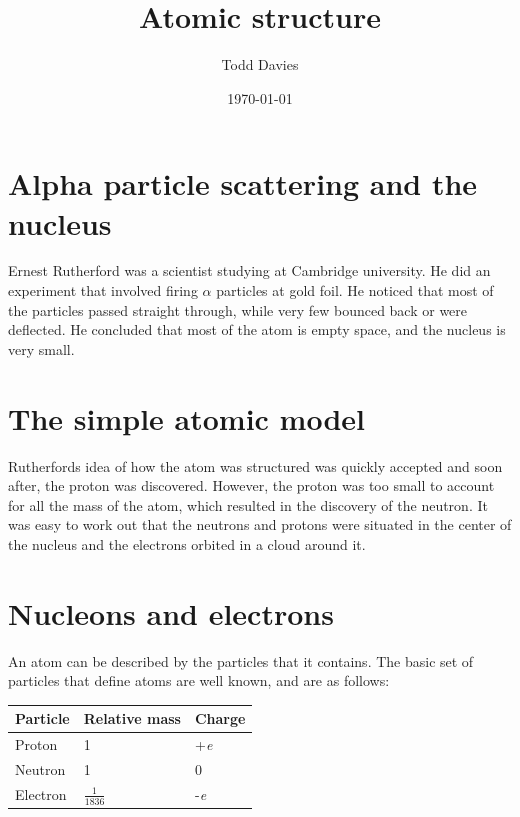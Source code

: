 \documentclass{article}
\title{Atomic structure}
\author{Todd Davies}
\date{\today}
\begin{document}
\lhead{\today}

\maketitle

\section*{Alpha particle scattering and the nucleus}
\thispagestyle{empty}

Ernest Rutherford was a scientist studying at Cambridge university. He did an
experiment that involved firing $\alpha$ particles at gold foil. He noticed that
most of the particles passed straight through, while very few bounced back or
were deflected. He concluded that most of the atom is empty space, and the
nucleus is very small.

\section*{The simple atomic model}

Rutherfords idea of how the atom was structured was quickly accepted and soon
after, the proton was discovered. However, the proton was too small to account
for all the mass of the atom, which resulted in the discovery of the neutron. It
was easy to work out that the neutrons and protons were situated in the center
of the nucleus and the electrons orbited in a cloud around it.

\section*{Nucleons and electrons}

An atom can be described by the particles that it contains. The basic set of
particles that define atoms are well known, and are as follows:

\begin{center}
 	\renewcommand{\arraystretch}{1.2}
	\begin{tabular}{l|l|l}
		{\bf Particle} & {\bf Relative mass} & {\bf Charge} \\ \hline
		Proton & 1 & +{\it e}\\ \hline
		Neutron & 1 & 0\\ \hline
		Electron & $\frac{1}{1836}$ & -{\it e}
	\end{tabular}

\end{center}
\end{document}
